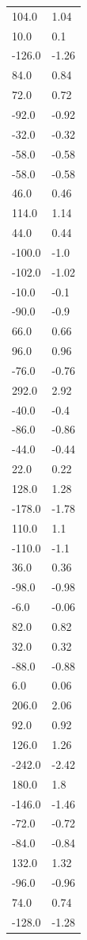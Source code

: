 \begin{longtable}{ll}
104.0 & 1.04 \\
10.0 & 0.1 \\
-126.0 & -1.26 \\
84.0 & 0.84 \\
72.0 & 0.72 \\
-92.0 & -0.92 \\
-32.0 & -0.32 \\
-58.0 & -0.58 \\
-58.0 & -0.58 \\
46.0 & 0.46 \\
114.0 & 1.14 \\
44.0 & 0.44 \\
-100.0 & -1.0 \\
-102.0 & -1.02 \\
-10.0 & -0.1 \\
-90.0 & -0.9 \\
66.0 & 0.66 \\
96.0 & 0.96 \\
-76.0 & -0.76 \\
292.0 & 2.92 \\
-40.0 & -0.4 \\
-86.0 & -0.86 \\
-44.0 & -0.44 \\
22.0 & 0.22 \\
128.0 & 1.28 \\
-178.0 & -1.78 \\
110.0 & 1.1 \\
-110.0 & -1.1 \\
36.0 & 0.36 \\
-98.0 & -0.98 \\
-6.0 & -0.06 \\
82.0 & 0.82 \\
32.0 & 0.32 \\
-88.0 & -0.88 \\
6.0 & 0.06 \\
206.0 & 2.06 \\
92.0 & 0.92 \\
126.0 & 1.26 \\
-242.0 & -2.42 \\
180.0 & 1.8 \\
-146.0 & -1.46 \\
-72.0 & -0.72 \\
-84.0 & -0.84 \\
132.0 & 1.32 \\
-96.0 & -0.96 \\
74.0 & 0.74 \\
-128.0 & -1.28 \\

\end{longtable}
